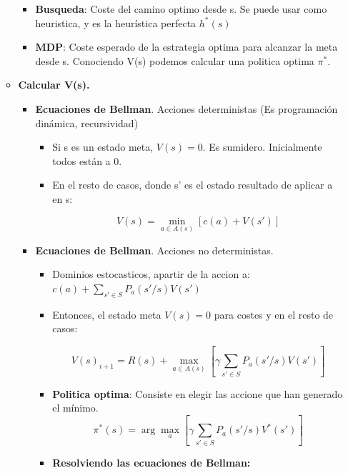 \documentclass[12pt, twoside, openright]{report} %
\begin{document}
\begin{itemize}
\begin{itemize}
\begin{itemize}
      \item \textbf{Busqueda}: Coste del camino optimo desde s. Se puede
        usar como heuristica, y es la heurística perfecta $h^*(s)$
        
      \item \textbf{MDP}: Coste esperado de la estrategia optima para
        alcanzar la meta desde s. Conociendo V(s) podemos calcular una
        politica optima $\pi^*$.
        
      \end{itemize}
    \item \textbf{Calcular V(s).}
      

      \begin{itemize}
      \item \textbf{Ecuaciones de Bellman}. Acciones deterministas (Es
        programación dinámica, recursividad)
        

        \begin{itemize}
        \item Si s es un estado meta, $V(s) = 0$. Es sumidero. Inicialmente
          todos están a 0.
          
        \item En el resto de casos, donde s' es el estado resultado de
          aplicar a en s:
          
		  $$V(s) = \min_{a\in A(s)} [c(a)+V(s')]$$

        \end{itemize}
      \item \textbf{Ecuaciones de Bellman}. Acciones no deterministas.
        

        \begin{itemize}
        \item Dominios estocasticos, apartir de la accion a: $c(a) + \sum\limits_{s'\in S} P_a (s'/s)V(s')$
          
        \item Entonces, el estado meta $V(s)=0$ para costes y en el resto de
          casos:

		  $$V(s)_{i+1}= R(s)+ \max_{a\in A(s)} [\gamma \sum\limits_{s'\in S} P_a(s'/s) V(s')]$$
          
        \item \textbf{Politica optima}: Consiste en elegir las accione que
          han generado el mínimo.
          $$\pi^*(s)= \arg \max_{a} [\gamma \sum\limits_{s'\in S} P_a(s'/s) V^*(s')]$$

		  \pagebreak
        \item \textbf{Resolviendo las ecuaciones de Bellman:}
          


\end{itemize}
\end{itemize}
\end{itemize}
\end{itemize}
\end{document}
